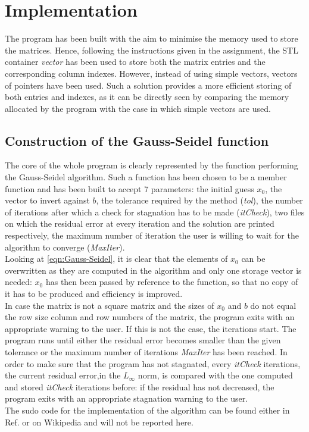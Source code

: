 \documentclass{article}
\theoremstyle{theorem}
\theoremstyle{definition}
\begin{document}
\section{Implementation}
The program has been built with the aim to minimise the memory used to store the matrices. Hence, following the instructions given in the assignment, the STL container \emph{vector} has been used to store both the matrix entries and the corresponding column indexes. However, instead of using simple vectors, vectors of pointers have been used. Such a solution provides a more efficient storing of both entries and indexes, as it can be directly seen by comparing the memory allocated by the program with the case in which simple vectors are used.\\

\subsection{Construction of the Gauss-Seidel function}
The core of the whole program is clearly represented by the function performing the Gauss-Seidel algorithm. Such a function has been chosen to be a member function and has been built to accept 7 parameters: the initial guess $x_0$, the vector to invert against $b$, the tolerance required by the method (\emph{tol}), the number of iterations after which a check for stagnation has to be made (\emph{itCheck}), two files on which the residual error at every iteration and the solution are printed respectively, the maximum number of iteration the user is willing to wait for the algorithm to converge (\emph{MaxIter}).\\
Looking at \ref{eqn:Gauss-Seidel}, it is clear that the elements of $x_0$ can be overwritten as they are computed in the algorithm and only one storage vector is needed: $x_0$ has then been passed by reference to the function, so that no copy of it has to be produced and efficiency is improved.\\  
In case the matrix is not a square matrix and the sizes of $x_0$ and $b$ do not equal the row size column and row numbers of the matrix, the program exits with an appropriate warning to the user. If this is not the case, the iterations start. The program runs until either the residual error becomes smaller than the given tolerance or the maximum number of iterations \emph{MaxIter} has been reached. In order to make sure that the program has not stagnated, every \emph{itCheck} iterations, the current residual error,in the $L_\infty$ norm, is compared with the one computed and stored \emph{itCheck} iterations before: if the residual has not decreased, the program exits with an appropriate stagnation warning to the user.\\
The sudo code for the implementation of the algorithm can be found either in Ref.\cite{lec-notes} or on Wikipedia and will not be reported here.\\
\end{document}
